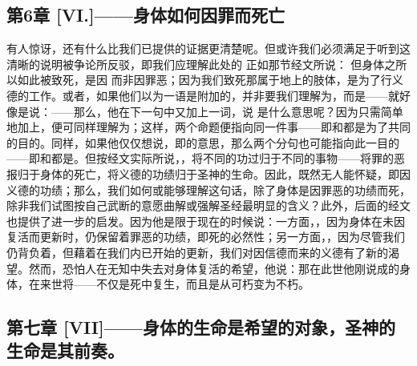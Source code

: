 
\subsection{第6章 [VI.]——身体如何因罪而死亡}

有人惊讶，还有什么比我们已提供的证据更清楚呢。但或许我们必须满足于听到这清晰的说明被争论所反驳，即我们应理解此处的 正如那节经文所说： 但身体之所以如此被致死，是因 而非因罪恶；因为我们致死那属于地上的肢体，是为了行义德的工作。或者，如果他们以为一语是附加的，并非要我们理解为，而是——就好像是说：——那么，他在下一句中又加上一词，说 是什么意思呢？因为只需简单地加上，便可同样理解为；这样，两个命题便指向同一件事——即和都是为了共同的目的。同样，如果他仅仅想说，即的意思，那么两个分句也可能指向此一目的——即和都是。但按经文实际所说，，将不同的功过归于不同的事物——将罪的恶报归于身体的死亡，将义德的功绩归于圣神的生命。因此，既然无人能怀疑，即因义德的功绩；那么，我们如何或能够理解这句话，除了身体是因罪恶的功绩而死，除非我们试图按自己武断的意愿曲解或强解圣经最明显的含义？此外，后面的经文也提供了进一步的启发。因为他是限于现在的时候说：一方面，，因为身体在未因复活而更新时，仍保留着罪恶的功绩，即死的必然性；另一方面，，因为尽管我们仍背负着，但藉着在我们内已开始的更新，我们对因信德而来的义德有了新的渴望。然而，恐怕人在无知中失去对身体复活的希望，他说：那在此世他刚说成的身体，在来世将——不仅是死中复生，而且是从可朽变为不朽。\par


\subsection{第七章 [VII]——身体的生命是希望的对象，圣神的生命是其前奏。}

